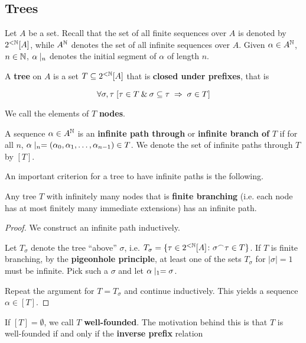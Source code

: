 \subsection{Trees}

Let $A$ be a set. Recall that the set of all finite sequences over $A$ is denoted by $2^{<\mathbb{N}}[A]$, while $A^{\mathbb{N}}$ denotes the set of all infinite sequences over $A$. Given $\alpha \in A^{\mathbb{N}}$, $n \in \mathbb{N}$, $\alpha\mid_{n}$ denotes the initial segment of $\alpha$ of length $n$.

\begin{definition}\label{def-tree}A \textbf{tree} on $A$ is a set $T \subseteq 2^{<\mathbb{N}}[A]$ that is \textbf{closed under prefixes}, that is

\begin{equation}
\forall \sigma, \tau \; [\tau \in T \: \& \: \sigma \subseteq \tau \; \Rightarrow \; \sigma \in T ]
\end{equation}

\end{definition}We call the elements of $T$ \textbf{nodes}.

A sequence $\alpha \in A^{\mathbb{N}}$ is an \textbf{infinite path through} or \textbf{infinite branch of} $T$ if for all $n$, $\alpha\mid_{n} = (\alpha_0, \alpha_1, \dots, \alpha_{n -1}) \in T$. We denote the set of infinite paths through $T$ by $[T]$.

An important criterion for a tree to have infinite paths is the following.

\begin{theorem}\label{thm-koenigs-lemma}Any tree $T$ with infinitely many nodes that is \textbf{finite branching} (i.e. each node has at most finitely many immediate extensions) has an infinite path.

\end{theorem}\begin{proof}We construct an infinite path inductively.

Let $T_\sigma$ denote the tree ``above'' $\sigma$, i.e. $T_\sigma = \{ \tau \in 2^{<\mathbb{N}}[A] \colon \sigma\mbox{}^\frown\tau \in T\}$. If $T$ is finite branching,  by the \textbf{pigeonhole principle}, at least one of the sets $T_\sigma$ for $|\sigma| = 1$ must be infinite. Pick such a $\sigma$ and let $\alpha\mid_{1} = \sigma$.

Repeat the argument for $T = T_\sigma$ and continue inductively. This yields a sequence $\alpha \in [T]$.

\end{proof}If $[T] = \emptyset$, we call $T$ \textbf{well-founded}. The motivation behind this is that $T$ is well-founded if and only if the \textbf{inverse prefix} relation

